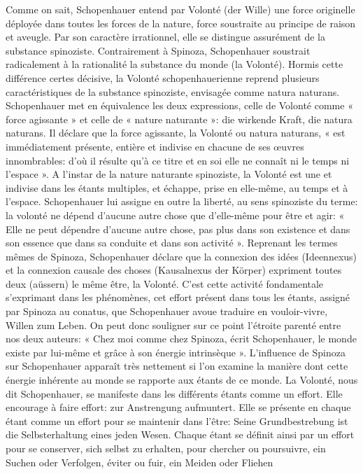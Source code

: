 Comme on sait, Schopenhauer entend par Volonté (der Wille) une force originelle déployée dans toutes les
forces de la nature, force soustraite au principe de raison et aveugle. Par son caractère irrationnel, elle se
distingue assurément de la substance spinoziste. Contrairement à Spinoza, Schopenhauer soustrait
radicalement à la rationalité la substance du monde (la Volonté). Hormis cette différence certes décisive, la
Volonté schopenhauerienne reprend plusieurs caractéristiques de la substance spinoziste, envisagée comme
natura naturans. Schopenhauer met en équivalence les deux expressions, celle de Volonté comme « force
agissante » et celle de « nature naturante »: die wirkende Kraft, die natura naturans.
Il déclare que la force agissante, la Volonté ou natura naturans, « est immédiatement présente,
entière et indivise en chacune de ses œuvres innombrables: d’où il résulte qu’à ce titre et en soi elle ne
connaît ni le temps ni l’espace ». A l’instar de la nature naturante spinoziste, la
Volonté est une et indivise dans les étants multiples, et échappe, prise en elle-même, au temps et à l’espace.
Schopenhauer lui assigne en outre la liberté, au sens spinoziste du terme: la volonté ne dépend d’aucune
autre chose que d’elle-même pour être et agir: « Elle ne peut dépendre d’aucune autre chose, pas plus dans
son existence et dans son essence que dans sa conduite et dans son activité ».
Reprenant les termes mêmes de Spinoza, Schopenhauer déclare que la connexion des idées (Ideennexus) et
la connexion causale des choses (Kausalnexus der Körper) expriment toutes deux (aüssern) le même être, la
Volonté. C’est cette activité fondamentale s’exprimant dans les phénomènes, cet
effort présent dans tous les étants, assigné par Spinoza au conatus, que Schopenhauer avoue traduire en
vouloir-vivre, Willen zum Leben. On peut donc souligner sur ce point l’étroite
parenté entre nos deux auteurs: « Chez moi comme chez Spinoza, écrit Schopenhauer, le monde existe par
lui-même et grâce à son énergie intrinsèque ». L’influence de Spinoza sur Schopenhauer
apparaît très nettement si l’on examine la manière dont cette énergie inhérente au monde se rapporte aux
étants de ce monde.
La Volonté, nous dit Schopenhauer, se manifeste dans les différents étants comme un effort. Elle
encourage à faire effort: zur Anstrengung aufmuntert. Elle se présente en chaque
étant comme un effort pour se maintenir dans l’être: Seine Grundbestrebung ist die Selbsterhaltung eines
jeden Wesen. Chaque étant se définit ainsi par un effort pour se conserver, sich selbst zu
erhalten, pour chercher ou poursuivre, ein Suchen oder Verfolgen, éviter ou fuir, ein Meiden oder Fliehen
